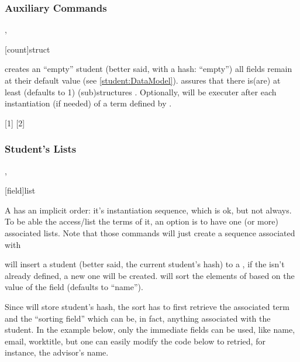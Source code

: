 \documentclass[10pt]{article}
\begin{document}
\subsubsection{Auxiliary Commands}\label{student:auxcmds}
\begin{codedescribe}{\emptytermifnone,\emptyfields}
  \begin{codesyntax}
    \tsmacro{\emptytermifnone}[count]{struct}
    \tsmacro{\emptyfields}{}
  \end{codesyntax}
  \tsobj{\emptyfields} creates an ``empty'' student (better said, with a hash: ``empty'') all fields remain at their default value (see \ref{student:DataModel}). \tsobj{\emptytermifnone} assures that there is(are) at least  (defaults to 1) (sub)structures . Optionally,  will be executer after each instantiation (if needed) of a term defined by .
\end{codedescribe}

[1]
[2]



\subsubsection{Student's Lists}
\begin{codedescribe}{\studentaddtolist,\studentlistsort}
\begin{codesyntax}
  \tsmacro{\studentlistsort}[field]{list}
\end{codesyntax}
A  has an implicit order: it's instantiation sequence, which is ok, but not always. To be able the access/list the terms of it, an option is to have one (or more) associated lists. Note that those commands will just create a sequence associated with 

\tsobj{\studentaddtolist} will insert a student (better said, the current student's hash) to a , if the  isn't already defined, a new one will be created. \tsobj{\studentlistsort} will sort the elements of  based on the value of the field  (defaults to ``name'').
\end{codedescribe}
\begin{tsremark}
  Since  will store student's hash, the sort has to first retrieve the associated  term and the ``sorting field'' which can be, in fact, anything associated with the student. In the example below, only the immediate fields can be used, like name, email, worktitle, but one can easily modify the code below to retried, for instance, the advisor's name.
\end{tsremark}
\end{document}

